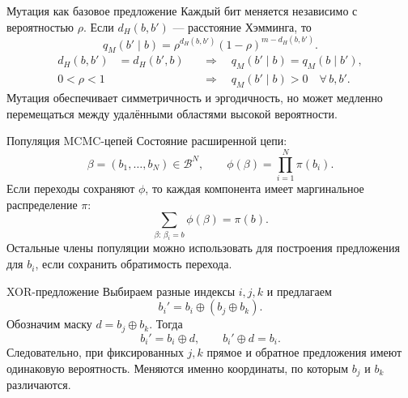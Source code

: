 \documentclass[aspectratio=169,11pt]{beamer}
\begin{document}
\begin{frame}{Мутация как базовое предложение}
  Каждый бит меняется независимо с вероятностью $\rho$.
  Если $d_H(b,b')$ — расстояние Хэмминга, то
  \[
    q_M(b'\mid b)
    =\rho^{d_H(b,b')}(1-\rho)^{m-d_H(b,b')}.
  \]
  \vspace{0.12cm}
  \begin{align*}
    d_H(b,b')&=d_H(b',b)
      &&\Longrightarrow\quad q_M(b'\mid b)=q_M(b\mid b'),\\
    0<\rho<1
      &&&\Longrightarrow\quad q_M(b'\mid b)>0\quad\forall\,b,b'.
  \end{align*}
  \vspace{0.1cm}
  Мутация обеспечивает симметричность и эргодичность, но может медленно
  перемещаться между удалёнными областями высокой вероятности.
\end{frame}

\begin{frame}{Популяция MCMC-цепей}
  Состояние расширенной цепи:
  \[
    \beta=(b_1,\ldots,b_N)\in\mathcal B^N,
    \qquad
    \phi(\beta)=\prod_{i=1}^{N}\pi(b_i).
  \]
  \vspace{0.15cm}
  Если переходы сохраняют $\phi$, то каждая компонента имеет маргинальное
  распределение $\pi$:
  \[
    \sum_{\beta:\,\beta_i=b}\phi(\beta)=\pi(b).
  \]
  \vspace{0.15cm}
  Остальные члены популяции можно использовать для построения предложения
  для $b_i$, если сохранить обратимость перехода.
\end{frame}

\begin{frame}{XOR-предложение}
  Выбираем разные индексы $i,j,k$ и предлагаем
  \[
    b_i'=b_i\oplus(b_j\oplus b_k).
  \]
  Обозначим маску $d=b_j\oplus b_k$. Тогда
  \[
    b_i'=b_i\oplus d,\qquad
    b_i'\oplus d=b_i.
  \]
  \vspace{0.2cm}
  Следовательно, при фиксированных $j,k$ прямое и обратное предложения
  имеют одинаковую вероятность. Меняются именно координаты, по которым
  $b_j$ и $b_k$ различаются.
\end{frame}
\end{document}
